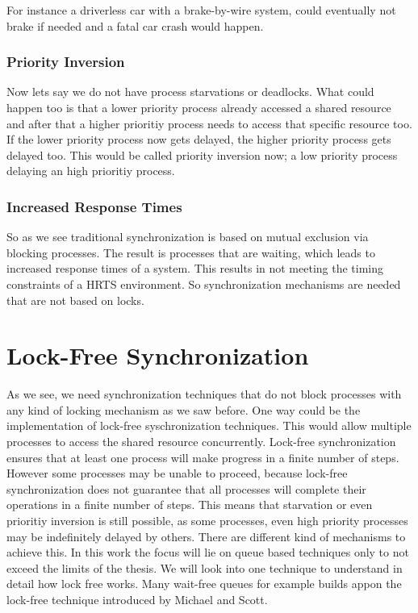For instance a driverless car with a brake-by-wire system, could eventually not brake if needed and a fatal car crash would happen. 


\subsubsection{Priority Inversion}\label{subsubsec:priority-inversion}

Now lets say we do not have process starvations or deadlocks. What could happen too is that a lower priority process already accessed a shared resource and after that a higher prioritiy process needs to access that specific resource too. If the lower priority process now gets delayed, the higher priority process gets delayed too. This would be called priority inversion now; a low priority process delaying an high prioritiy process. \cite{priorityInversion}

\subsubsection{Increased Response Times}\label{subsubsec:increased-response-times}

So as we see traditional synchronization is based on mutual exclusion via blocking processes. The result is processes that are waiting, which leads to increased response times of a system. This results in not meeting the timing constraints of a \ac{HRTS} environment. So synchronization mechanisms are needed that are not based on locks.

\section{Lock-Free Synchronization}\label{sec:lock-free}

As we see, we need synchronization techniques that do not block processes with any kind of locking mechanism as we saw before. One way could be the implementation of lock-free syschronization techniques. This would allow multiple processes to access the shared resource concurrently. Lock-free synchronization ensures that at least one process will make progress in a finite number of steps. However some processes may be unable to proceed, because lock-free synchronization does not guarantee that all processes will complete their operations in a finite number of steps. This means that starvation or even prioritiy inversion is still possible, as some processes, even high priority processes may be indefinitely delayed by others. There are different kind of mechanisms to achieve this. In this work the focus will lie on queue based techniques only to not exceed the limits of the thesis. We will look into one technique to understand in detail how lock free works. Many wait-free queues for example builds appon the lock-free technique introduced by Michael and Scott. \cite{MichaelScottQueue}

